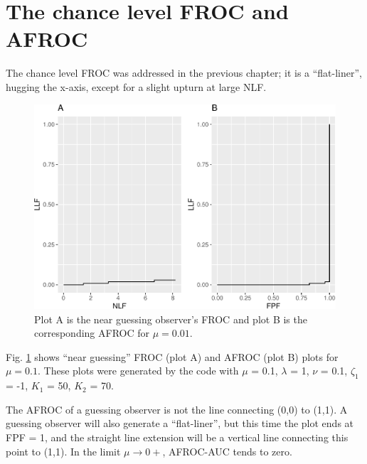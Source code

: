 \documentclass[
]{book}
\begin{document}
\hypertarget{the-chance-level-froc-and-afroc}{%
\section{The chance level FROC and AFROC}\label{the-chance-level-froc-and-afroc}}

The chance level FROC was addressed in the previous chapter; it is a ``flat-liner'', hugging the x-axis, except for a slight upturn at large NLF.

\begin{figure}
\centering
\includegraphics{13b-froc-empirical2_files/figure-latex/froc-afroc-chance-level-1.pdf}
\caption{\label{fig:froc-afroc-chance-level}Plot A is the near guessing observer's FROC and plot B is the corresponding AFROC for \(\mu=0.01\).}
\end{figure}

Fig. \ref{fig:froc-afroc-chance-level} shows ``near guessing'' FROC (plot A) and AFROC (plot B) plots for \(\mu = 0.1\). These plots were generated by the code with \(\mu\) = 0.1, \(\lambda\) = 1, \(\nu\) = 0.1, \(\zeta_1\) = -1, \(K_1\) = 50, \(K_2\) = 70.

The AFROC of a guessing observer is not the line connecting (0,0) to (1,1). A guessing observer will also generate a ``flat-liner'', but this time the plot ends at FPF = 1, and the straight line extension will be a vertical line connecting this point to (1,1). In the limit \(\mu \rightarrow 0+\), AFROC-AUC tends to zero.
\end{document}

